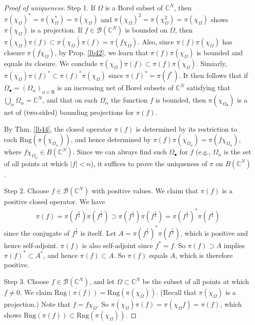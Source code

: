 \documentclass[12pt,a4paper,notitlepage]{article}
\theoremstyle{definition}
\theoremstyle{plain}
\newcommand{\fk}{\mathfrak}
\newcommand{\ovl}{\overline}
\newcommand{\scr}{\mathscr}
\newcommand{\blt}{\bullet}
\newcommand{\Cbb}{\mathbb C}
\newcommand{\Rng}{\mathrm{Rng}}
\numberwithin{equation}{section}
\begin{document}
\begin{proof}[Proof of uniqueness]
Step 1. If $\Omega$ is a Borel subset of $\Cbb^N$, then $\pi(\chi_\Omega)^*=\pi(\chi_\Omega^*)=\pi(\chi_\Omega)$ and $\pi(\chi_\Omega)^2=\pi(\chi_\Omega^2)=\pi(\chi_\Omega)$ shows $\pi(\chi_\Omega)$ is a projection. If $f\in\scr B(\Cbb^N)$ is bounded on $\Omega$, then $\pi(\chi_{\Omega})\pi(f)\subset \ovl{\pi(\chi_{\Omega})\pi(f)}=\pi(f\chi_\Omega)$. Also, since $\pi(f)\pi(\chi_\Omega)$ has closure $\pi(f\chi_\Omega)$, by Prop. \ref{lb42}, we learn that $\pi(f)\pi(\chi_\Omega)$ is bounded and equals its closure. We conclude $\pi(\chi_\Omega)\pi(f)\subset\pi(f)\pi(\chi_\Omega)$. Simiarly, $\pi(\chi_\Omega)\pi(f)^*\subset\pi(f)^*\pi(\chi_\Omega)$ since $\pi(f)^*=\pi(f^*)$. It then follows that if $\Omega_\blt=(\Omega_\alpha)_{\alpha\in\fk A}$ is an increasing net of Borel subsets of $\Cbb^N$ satisfying that $\bigcup_\alpha \Omega_\alpha=\Cbb^N$, and that on each $\Omega_\alpha$ the function $f$ is bounded, then $\pi(\chi_{\Omega_\blt})$ is a net of (two-sided) bounding projections for $\pi(f)$. 

By Thm. \ref{lb44}, the closed operator $\pi(f)$ is determined by its restriction to each $\Rng(\pi(\chi_{\Omega_\alpha}))$, and hence determined by $\pi(f)\pi(\chi_{\Omega_\alpha})=\pi(f\chi_{\Omega_\alpha})$, where $f\chi_{\Omega_\alpha}\in B(\Cbb^N)$. Since we can always find such $\Omega_\blt$ for $f$ (e.g., $\Omega_n$ is the set of all points at which $|f|<n$),  it suffices to prove the uniqueness of $\pi$ on $B(\Cbb^N)$.

Step 2. Choose $f\in\scr B(\Cbb^N)$ with positive values. We claim that $\pi(f)$ is a positive closed operator. We have
\begin{align*}
	\pi(f)=\ovl{\pi(f^{\frac 12})\pi(f^{\frac 12})}\supset \pi(f^{\frac 12})\pi(f^{\frac 12})=\pi(f^{\frac 12})^*\pi(f^{\frac 12})
\end{align*}
since the conjugate of $f^{\frac 12}$ is itself. Let $A=\pi(f^{\frac 12})^*\pi(f^{\frac 12})$, which is positive and hence self-adjoint. $\pi(f)$ is also self-adjoint since $f^*=f$. So $\pi(f)\supset A$ implies $\pi(f)^*\subset A^*$, and hence $\pi(f)\subset A$. So $\pi(f)$ equals $A$, which is therefore positive.

Step 3. Choose $f\in\scr B(\Cbb^N)$, and let $\Omega\subset\Cbb^N$ be the subset of all points at which $f\neq 0$. We claim $\ovl{\Rng(\pi(f))}=\Rng(\pi(\chi_\Omega))$. (Recall that $\pi(\chi_\Omega)$ is a projection.) Note that $f=f\chi_\Omega$. So $\ovl {\pi(\chi_\Omega)\pi(f)}= \pi(\chi_\Omega f)=\pi(f)$, which shows $\Rng(\pi(f))\subset\Rng(\pi(\chi_\Omega))$.


\end{proof}
\end{document}
